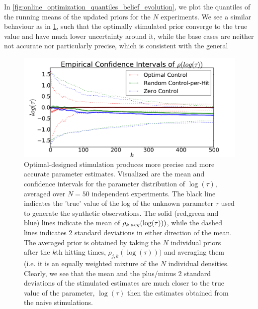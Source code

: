 \documentclass{article}
\begin{document}
In \cref{fig:online_optimization_quantiles_belief_evolution}, we plot the
quantiles of the running means of the updated priors for the  $N$
experiments. We see a similar behaviour as in
\cref{fig:online_optimization_aggregated_belief_evolution}, such that the
optimally stimulated prior converge to the true value and have much lower
uncertainty around it, while the base cases are neither not accurate nor
particularly precise, which is consistent with the general 
 
 
\begin{figure}[htp]
\begin{center}
  \includegraphics[width=\textwidth]{Figs/HTOnlineEstimator/online_updated_prior_mean_aggregated_ensemble.pdf}
  \caption[Optimal Stimulation produces more precise parameter estimates]
  {Optimal-designed stimulation produces more precise and more accurate
  parameter estimates. 
  Visualized are the mean and confidence intervals for the parameter
  distribution of $\log (\tau)$, averaged over $N=50$ independent
  experiments. The black line indicates the 'true' value of the log of the
  unknown parameter $\tau$ used to generate the
  synthetic observations. 
  The solid (red,green and blue) lines indicate the mean of
  $\rho_{k, avg}(\log({\tau})))$, while the dashed lines indicates 2 standard
  deviations in either direction of the mean. 
  The averaged prior is obtained by taking the $N$ individual priors after the
  $k$th hitting times, $\rho_{j,k}(\log(\tau)))$ and averaging them (i.e. it is
  an equally weighted mixture of the $N$ individual densities.
Clearly, we see that the mean and the plus/minus 2 standard deviations of the 
stimulated estimates are much closer to the true value of the parameter,
$\log(\tau)$ then the estimates obtained from the naive stimulations.}
  \label{fig:online_optimization_aggregated_belief_evolution}
\end{center}
\end{figure}
\end{document}
